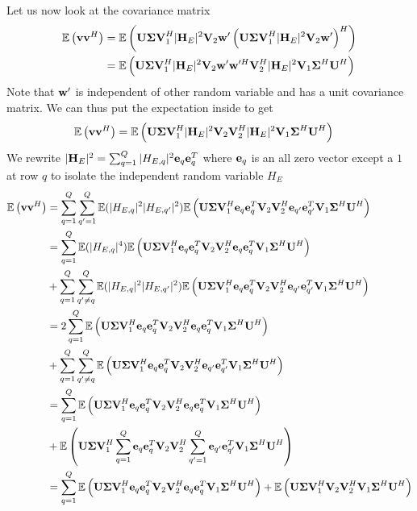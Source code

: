 \documentclass[12pt]{article}
\begin{document}
Let us now look at the covariance matrix
\begin{align}
	\mathbb{E}\left(\vect{v}\vect{v}^H\right)&=\mathbb{E}\left(\mat{U} \mat{\Sigma}\mat{V}_1^H |\mat{H}_E|^2 \mat{V}_2 \vect{w}'\left(\mat{U} \mat{\Sigma}\mat{V}_1^H |\mat{H}_E|^2 \mat{V}_2 \vect{w}'\right)^H\right)\\
	&=\mathbb{E}\left(\mat{U} \mat{\Sigma}\mat{V}_1^H |\mat{H}_E|^2 \mat{V}_2 \vect{w}'\vect{w}'^H\mat{V}_2^H|\mat{H}_E|^2\mat{V}_1 \mat{\Sigma}^H   \mat{U}^H\right)
\end{align}
Note that $\vect{w}'$ is independent of other random variable and has a unit covariance matrix. We can thus put the expectation inside to get
\begin{align}
\mathbb{E}\left(\vect{v}\vect{v}^H\right)&=\mathbb{E}\left(\mat{U} \mat{\Sigma}\mat{V}_1^H |\mat{H}_E|^2 \mat{V}_2 \mat{V}_2^H|\mat{H}_E|^2\mat{V}_1 \mat{\Sigma}^H   \mat{U}^H\right)
\end{align}
We rewrite $|\mat{H}_E|^2=\sum_{q=1}^Q|H_{E,q}|^2 \vect{e}_q \vect{e}_q^T $ where $\vect{e}_q$ is an all zero vector except a $1$ at row $q$ to isolate the independent random variable $H_E$
\begin{align}
\mathbb{E}\left(\vect{v}\vect{v}^H\right)&=\sum_{q=1}^Q\sum_{q'=1}^Q\mathbb{E}(|H_{E,q}|^2|H_{E,q'}|^2)\mathbb{E}\left(\mat{U} \mat{\Sigma}\mat{V}_1^H  \vect{e}_q \vect{e}_q^T \mat{V}_2 \mat{V}_2^H \vect{e}_{q'} \vect{e}_{q'}^T\mat{V}_1 \mat{\Sigma}^H   \mat{U}^H\right)\\
&=\sum_{q=1}^Q\mathbb{E}(|H_{E,q}|^4)\mathbb{E}\left(\mat{U} \mat{\Sigma}\mat{V}_1^H  \vect{e}_q \vect{e}_q^T \mat{V}_2 \mat{V}_2^H \vect{e}_{q} \vect{e}_{q}^T\mat{V}_1 \mat{\Sigma}^H   \mat{U}^H\right)\\
&+\sum_{q=1}^Q\sum_{q'\neq q}^Q\mathbb{E}(|H_{E,q}|^2|H_{E,q'}|^2)\mathbb{E}\left(\mat{U} \mat{\Sigma}\mat{V}_1^H  \vect{e}_q \vect{e}_q^T \mat{V}_2 \mat{V}_2^H \vect{e}_{q'} \vect{e}_{q'}^T\mat{V}_1 \mat{\Sigma}^H   \mat{U}^H\right)\\
&=2\sum_{q=1}^Q\mathbb{E}\left(\mat{U} \mat{\Sigma}\mat{V}_1^H  \vect{e}_q \vect{e}_q^T \mat{V}_2 \mat{V}_2^H \vect{e}_{q} \vect{e}_{q}^T\mat{V}_1 \mat{\Sigma}^H   \mat{U}^H\right)\\
&+\sum_{q=1}^Q\sum_{q'\neq q}^Q\mathbb{E}\left(\mat{U} \mat{\Sigma}\mat{V}_1^H  \vect{e}_q \vect{e}_q^T \mat{V}_2 \mat{V}_2^H \vect{e}_{q'} \vect{e}_{q'}^T\mat{V}_1 \mat{\Sigma}^H   \mat{U}^H\right)\\
&=\sum_{q=1}^Q\mathbb{E}\left(\mat{U} \mat{\Sigma}\mat{V}_1^H  \vect{e}_q \vect{e}_q^T \mat{V}_2 \mat{V}_2^H \vect{e}_{q} \vect{e}_{q}^T\mat{V}_1 \mat{\Sigma}^H   \mat{U}^H\right)\\
&+\mathbb{E}\left(\mat{U} \mat{\Sigma}\mat{V}_1^H \sum_{q=1}^Q \vect{e}_q \vect{e}_q^T \mat{V}_2 \mat{V}_2^H \sum_{q'=1}^Q\vect{e}_{q'} \vect{e}_{q'}^T\mat{V}_1 \mat{\Sigma}^H   \mat{U}^H\right)\\
&=\sum_{q=1}^Q\mathbb{E}\left(\mat{U} \mat{\Sigma}\mat{V}_1^H  \vect{e}_q \vect{e}_q^T \mat{V}_2 \mat{V}_2^H \vect{e}_{q} \vect{e}_{q}^T\mat{V}_1 \mat{\Sigma}^H   \mat{U}^H\right)+\mathbb{E}\left(\mat{U} \mat{\Sigma}\mat{V}_1^H  \mat{V}_2 \mat{V}_2^H \mat{V}_1 \mat{\Sigma}^H   \mat{U}^H\right)
\end{align}
\end{document}
